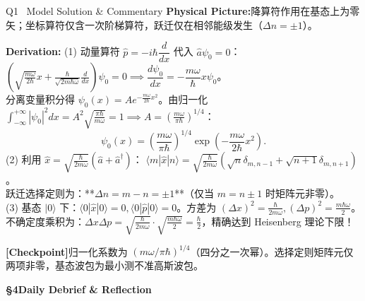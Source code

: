 \documentclass[a4paper,11pt]{article}
\newcommand{\alerttag}[1]{\textcolor{wine}{\sffamily\bfseries [#1]}}
\begin{document}
\begin{solution}{Q1 \textperiodcentered\ Model Solution \& Commentary}
\textbf{Physical Picture:}\enspace 降算符作用在基态上为零矢；坐标算符仅含一次阶梯算符，跃迁仅在相邻能级发生（$\Delta n = \pm 1$）。

\vspace{1mm}
\textbf{Derivation:}\enspace
(1) 动量算符 $\hat{p} = -i\hbar \dfrac{d}{dx}$ 代入 $\hat{a}\psi_0 = 0$：
$\left(\sqrt{\frac{m\omega}{2\hbar}}x + \frac{\hbar}{\sqrt{2m\hbar\omega}}\frac{d}{dx}\right)\psi_0 = 0 \implies \dfrac{d\psi_0}{dx} = -\dfrac{m\omega}{\hbar}x \psi_0$。\\
分离变量积分得 $\psi_0(x) = A e^{-\frac{m\omega}{2\hbar}x^2}$。由归一化 $\int_{-\infty}^{+\infty} |\psi_0|^2 dx = A^2 \sqrt{\frac{\pi\hbar}{m\omega}} = 1 \implies A = \left(\frac{m\omega}{\pi\hbar}\right)^{1/4}$：
\[
  \psi_0(x) = \left(\frac{m\omega}{\pi\hbar}\right)^{1/4} \exp\left(-\frac{m\omega}{2\hbar}x^2\right).
\]
(2) 利用 $\hat{x} = \sqrt{\frac{\hbar}{2m\omega}}(\hat{a}+\hat{a}^\dagger)$：
$\langle m|\hat{x}|n\rangle = \sqrt{\frac{\hbar}{2m\omega}}\left(\sqrt{n}\delta_{m, n-1} + \sqrt{n+1}\delta_{m, n+1}\right)$。\\
跃迁选择定则为：**$\Delta n = m - n = \pm 1$**（仅当 $m = n \pm 1$ 时矩阵元非零）。\\
(3) 基态 $|0\rangle$ 下：$\langle 0|\hat{x}|0\rangle = 0, \langle 0|\hat{p}|0\rangle = 0$。方差为 $(\Delta x)^2 = \frac{\hbar}{2m\omega}, (\Delta p)^2 = \frac{m\hbar\omega}{2}$。\\
不确定度乘积为：$\Delta x \Delta p = \sqrt{\frac{\hbar}{2m\omega}} \cdot \sqrt{\frac{m\hbar\omega}{2}} = \frac{\hbar}{2}$，精确达到 Heisenberg 理论下限！

\begin{notebox}
\alerttag{Checkpoint}\enspace 归一化系数为 $(m\omega/\pi\hbar)^{1/4}$（四分之一次幂）。选择定则矩阵元仅两项非零，基态波包为最小测不准高斯波包。
\end{notebox}
\end{solution}

\clearpage

{\Large\sffamily\bfseries\color{navy} \S 4\quad Daily Debrief \& Reflection}

\vspace{6pt}
\end{document}
